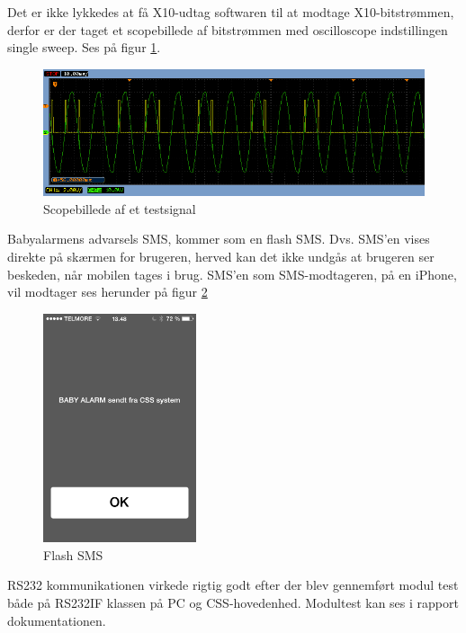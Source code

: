 Det er ikke lykkedes at få X10-udtag softwaren til at modtage X10-bitstrømmen, derfor er der taget et scopebillede af bitstrømmen med oscilloscope indstillingen single sweep. Ses på figur \ref{fig:Scop_test}.

\begin{figure}[htbp]
  \centering
    \includegraphics[width=\textwidth]{billeder/Modtager_0101_ON}
    \caption{Scopebillede af et testsignal}
    \label{fig:Scop_test}
\end{figure}

 
 
Babyalarmens advarsels SMS, kommer som en flash SMS. Dvs. SMS'en vises direkte på skærmen for brugeren, herved kan det ikke undgås at brugeren ser beskeden, når mobilen tages i brug. SMS'en som SMS-modtageren, på en iPhone, vil modtager ses herunder på figur \ref{fig:flashSMS}
 
\begin{figure}[htbp]
  \centering
    \includegraphics[width=0.4\textwidth]{billeder/flashSMS}
    \caption{Flash SMS}
    \label{fig:flashSMS}
\end{figure}
 
RS232 kommunikationen virkede rigtig godt efter der blev gennemført modul test både på RS232IF klassen på PC og CSS-hovedenhed. Modultest kan ses i rapport dokumentationen.

